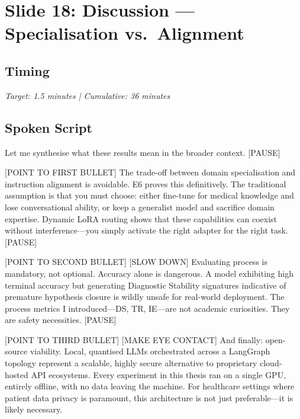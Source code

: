 

\section{Slide 18: Discussion --- Specialisation vs.\ Alignment}

\subsection*{Timing}
\textit{Target: 1.5 minutes | Cumulative: 36 minutes}

\subsection*{Spoken Script}
\begin{spokenbox}
 Let me synthesise what these results mean in the broader context. [PAUSE]

[POINT TO FIRST BULLET] The trade-off between domain specialisation and instruction alignment is avoidable. E6 proves this definitively. The traditional assumption is that you must choose: either fine-tune for medical knowledge and lose conversational ability, or keep a generalist model and sacrifice domain expertise. Dynamic LoRA routing shows that these capabilities can coexist without interference---you simply activate the right adapter for the right task. [PAUSE]

[POINT TO SECOND BULLET] [SLOW DOWN] Evaluating process is mandatory, not optional. Accuracy alone is dangerous. A model exhibiting high terminal accuracy but generating Diagnostic Stability signatures indicative of premature hypothesis closure is wildly unsafe for real-world deployment. The process metrics I introduced---DS, TR, IE---are not academic curiosities. They are safety necessities. [PAUSE]

[POINT TO THIRD BULLET] [MAKE EYE CONTACT] And finally: open-source viability. Local, quantised LLMs orchestrated across a LangGraph topology represent a scalable, highly secure alternative to proprietary cloud-hosted API ecosystems. Every experiment in this thesis ran on a single GPU, entirely offline, with no data leaving the machine. For healthcare settings where patient data privacy is paramount, this architecture is not just preferable---it is likely necessary.
\end{spokenbox}


